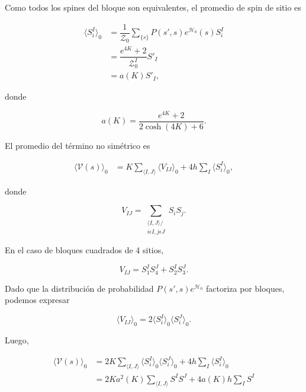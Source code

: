 \documentclass[10pt]{article}
\begin{document}
Como todos los spines del bloque son equivalentes, el promedio de spin de sitio es 

\begin{align}
\langle S_i^I \rangle_0 &= \dfrac{1}{\mathcal{Z}_0} \sum_{\lbrace s \rbrace} P(s', s) e^{\mathcal{H}_0}(s) S_i^I \nonumber \\
 &= \dfrac{e^{4K} + 2}{\mathcal{Z}_0^I} S'_I\nonumber \\
&= a(K) S'_I,
\end{align}

donde

\begin{equation}
a(K) =   \dfrac{e^{4K} + 2}{2 \cosh(4K) + 6}.
\end{equation}

El promedio del t\'ermino no sim\'etrico es

\begin{align}
\langle \mathcal{V}(s)\rangle_0 &= K\sum_{\langle I,J\rangle} \langle V_{IJ} \rangle_0 + 4 h \sum_I \langle S_i^I \rangle_0,
\end{align}

donde 

\begin{equation}
V_{IJ} = \sum_{\substack{\langle I,J\rangle/\\ i\epsilon I,j\epsilon J}} S_i S_j.
\end{equation}

En el caso de bloques cuadrados de 4 sitios,

\begin{equation}
V_{IJ} = S_1^I S_4^J+  S_2^I S_3^J.
\end{equation}

Dado que la distribuci\'on de probabilidad $P(s',s) e^{\mathcal{H}_0}$ factoriza por bloques, podemos expresar

\begin{equation}
\langle V_{IJ}\rangle_0 = 2\langle S_i^I \rangle_0 \langle S_i^J \rangle_0.
\end{equation}

Luego,


\begin{align}
\langle \mathcal{V}(s)\rangle_0 &= 2K\sum_{\langle I,J\rangle} \langle S_i^I \rangle_0 \langle S_i^J \rangle_0 + 4 h \sum_I  \langle S_i^I \rangle_0 \nonumber \\
&= 2K a^2(K) \sum_{\langle I,J\rangle} S^I S^J +   4 a(K) h \sum_I S^I 
\end{align}
\end{document}
